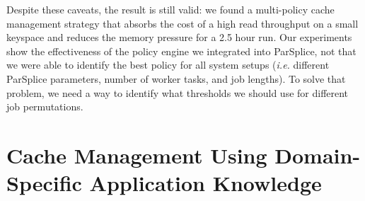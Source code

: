 Despite these caveats, the result is still valid: we found a multi-policy cache 
management strategy that absorbs the cost of a high read throughput on a small
keyspace and reduces the memory pressure for a 2.5 hour run. Our experiments
show the effectiveness of the policy engine we integrated into
ParSplice, not that we were able to identify the best policy for all system
setups ({\it i.e.} different ParSplice parameters, number of worker tasks, and
job lengths).  To solve that problem, we need a way to identify what thresholds
we should use for different job permutations.

\section{Cache Management Using Domain-Specific Application Knowledge}
\label{sec:dom-specific}

